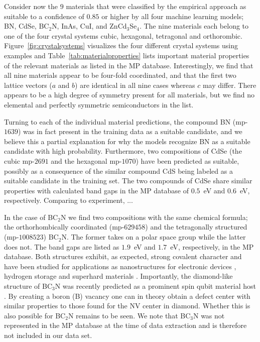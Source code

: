 \documentclass[superscriptaddress,unsortedaddress,
 amsmath,amssymb,
 aps,
]{revtex4-2}
\begin{document}
Consider now the $9$ materials that were classified by the empirical approach as suitable to a confidence of $0.85$ or higher by all four machine learning models; BN, CdSe, BC$_2$N, InAs, CuI, and ZnCd$_3$Se$_4$. 
The nine materials each belong to one of the four crystal systems cubic, hexagonal, tetragonal and orthorombic. Figure~\ref{fig:crystalsystems} visualizes the four different crystal systems using examples and  Table~\ref{tab:materialproperties} lists important material properties of the relevant materials as listed in the MP database.  Interestingly, we find that all nine materials appear to be four-fold coordinated, and that the first two lattice vectors ($a$ and $b$) are identical in all nine cases whereas $c$ may differ.  
There appears to be a high degree of symmetry present for all materials, but we find no elemental and perfectly symmetric semiconductors in the list. 


Turning to each of the individual material predictions, the compound BN (mp-$1639$) was in fact present in the training data as a suitable candidate, and we believe this a partial explanation for why the models recognize BN as a suitable candidate with high probability. Furthermore, two compositions of CdSe (the cubic mp-$2691$ and the hexagonal mp-$1070$) have been predicted as suitable, possibly as a consequence of the similar compound CdS being labeled as a suitable candidate in the training set. 
The two compounds of CdSe share similar properties with calculated band gaps in the MP database of $0.5$~eV and $0.6$~eV, respectively. Comparing to experiment, ... 

In the case of BC$_2$N we find two compositions with the same chemical formula; the orthorhombically coordinated (mp-$629458$) and the tetragonally structured (mp-$1008523$) BC$_2$N. The former takes on a polar space group while the latter does not. The band gaps are listed as $1.9$~eV and $1.7$~eV, respectively, in the MP database. 
Both structures exhibit, as expected, strong covalent character and have been studied for applications as nanostructures for electronic devices \cite{Gao2017}, hydrogen storage \cite{Cai2017} and superhard materials \cite{Li2017, Jiang2020}. Importantly, the diamond-like structure of BC$_3$N was recently predicted as a prominent spin qubit material host \cite{Wang2020SpinQB}. By creating a boron (B) vacancy one can in theory obtain a defect center with similar properties to those found for the NV center in diamond. Whether this is also possible for BC$_2$N remains to be seen. We note that BC$_3$N was not represented in the MP database at the time of data extraction and is therefore not included in our data set. 
\end{document}
